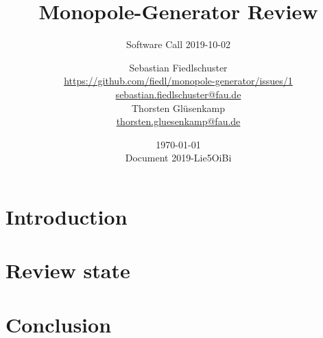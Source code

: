 \documentclass[green, 12pt]{beamer}
\title[Monopole-Generator Review, \url{https://github.com/fiedl/monopole-generator/issues/1}]{Monopole-Generator Review}
\subtitle{Software Call 2019-10-02}
\date{\today \\ \vspace*{2mm} \tiny{Document 2019-Lie5OiBi} \normalsize}
\author[Sebastian Fiedlschuster \& Thorsten Glüsenkamp]{Sebastian Fiedlschuster \\ \small\url{https://github.com/fiedl/monopole-generator/issues/1} \\ \small\url{sebastian.fiedlschuster@fau.de} \\ \vspace{2mm} \normalsize Thorsten Glüsenkamp \\ \small\url{thorsten.gluesenkamp@fau.de}}
\institute{Erlangen Centre for Astroparticle Physics}
\newif\ifplacelogo %
\begin{document}



\placelogofalse

\section{Introduction}


\section{Review state}


\section{Conclusion}


\end{document}
